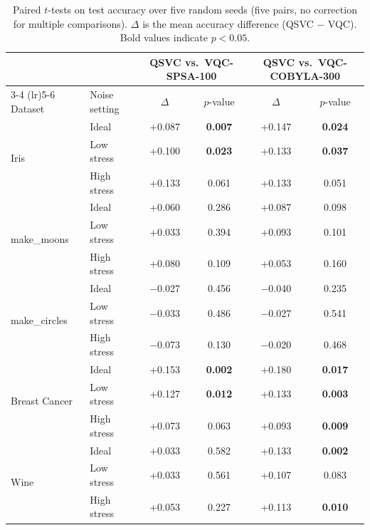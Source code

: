 \documentclass[12pt,a4paper]{article}
\newcommand{\chgcolor}{blue}
\begin{document}
\begin{table}[H]
  \centering
  \caption{Paired $t$-tests on test accuracy over five random seeds (five pairs, no correction for multiple comparisons). $\Delta$ is the mean accuracy difference (QSVC $-$ VQC). Bold values indicate $p < 0.05$.}
  \label{tab:pvalues}
  \footnotesize
  \setlength{\tabcolsep}{5pt}
  \renewcommand{\arraystretch}{1.2}
  {\color{\chgcolor}\begin{tabular}{llcccc}
    \toprule
    & & \multicolumn{2}{c}{QSVC vs.\ VQC-SPSA-100} & \multicolumn{2}{c}{QSVC vs.\ VQC-COBYLA-300} \\
    \cmidrule(lr){3-4} \cmidrule(lr){5-6}
    Dataset & Noise setting & $\Delta$ & $p$-value & $\Delta$ & $p$-value \\
    \midrule
    \multirow{3}{*}{Iris} & Ideal & +0.087 & \textbf{0.007} & +0.147 & \textbf{0.024} \\
  & Low stress & +0.100 & \textbf{0.023} & +0.133 & \textbf{0.037} \\
  & High stress & +0.133 & 0.061 & +0.133 & 0.051 \\
    \midrule
    \multirow{3}{*}{make\_moons} & Ideal & +0.060 & 0.286 & +0.087 & 0.098 \\
  & Low stress & +0.033 & 0.394 & +0.093 & 0.101 \\
  & High stress & +0.080 & 0.109 & +0.053 & 0.160 \\
    \midrule
    \multirow{3}{*}{make\_circles} & Ideal & $-$0.027 & 0.456 & $-$0.040 & 0.235 \\
  & Low stress & $-$0.033 & 0.486 & $-$0.027 & 0.541 \\
  & High stress & $-$0.073 & 0.130 & $-$0.020 & 0.468 \\
    \midrule
    \multirow{3}{*}{Breast Cancer} & Ideal & +0.153 & \textbf{0.002} & +0.180 & \textbf{0.017} \\
  & Low stress & +0.127 & \textbf{0.012} & +0.133 & \textbf{0.003} \\
  & High stress & +0.073 & 0.063 & +0.093 & \textbf{0.009} \\
    \midrule
    \multirow{3}{*}{Wine} & Ideal & +0.033 & 0.582 & +0.133 & \textbf{0.002} \\
  & Low stress & +0.033 & 0.561 & +0.107 & 0.083 \\
  & High stress & +0.053 & 0.227 & +0.113 & \textbf{0.010} \\
    \bottomrule
  \end{tabular}}
\end{table}
\end{document}
